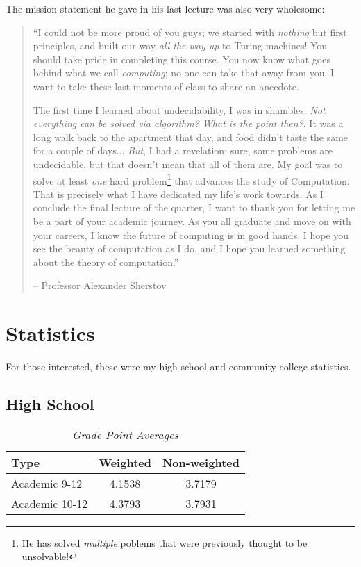 \documentclass[12pt]{article}
\renewcommand{\it}[1]{\textit{{#1}}}
\begin{document}
The mission statement he gave in his last lecture was also very wholesome:
\begin{quote}
  ``I could not be more proud of you guys; we started with \it{nothing} but
  first principles, and built our way \it{all the way up} to Turing machines!
  You should take pride in completing this course. You now know what goes behind
  what we call \it{computing}; no one can take that away from you. I want to
  take these last moments of class to share an anecdote.
  \vspace{0.5em}

  The first time I learned about undecidability, I was in shambles. \it{Not
  everything can be solved via algorithm? What is the point then?}. It was a
  long walk back to the apartment that day, and food didn't taste the same for a
  couple of days... \it{But}, I had a revelation; sure, some problems are
  undecidable, but that doesn't mean that all of them are. My goal was to solve
  at least \it{one} hard problem\footnote{He has solved \it{multiple} poblems
  that were previously thought to be unsolvable!} that advances the study of
  Computation. That is precisely what I have dedicated my life's work towards.
  As I conclude the final lecture of the quarter, I want to thank you for
  letting me be a part of your academic journey. As you all graduate and move on
  with your careers, I know the future of computing is in good hands. I hope you
  see the beauty of computation as I do, and I hope you learned something about
  the theory of computation.''
  \vspace{-1em}
  \begin{flushright}
    -- Professor Alexander Sherstov
  \end{flushright}
\end{quote}


\newpage
\section{Statistics}
For those interested, these were my high school and community college
statistics.
\subsection{High School}
\begin{table}[ht]
  \centering
  \caption*{\it{Grade Point Averages}}
  \vspace{-0.8em}
  \begin{tabular}{l|c|c}
    Type       & Weighted     & Non-weighted \\
    \hline
    Academic 9-12  & 4.1538   & 3.7179 \\
    Academic 10-12 & 4.3793   & 3.7931 \\
  \end{tabular}
  \vspace{-1em}
\end{table}
\end{document}
